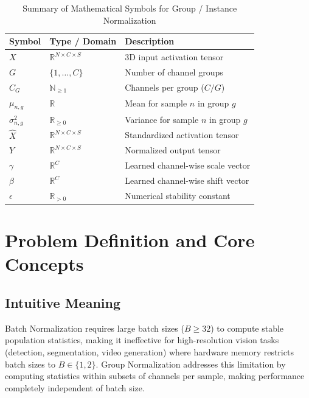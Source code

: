 \documentclass[11pt,a4paper]{article}
\theoremstyle{definition}
\begin{document}
\begin{table}[h]
\centering
\caption{Summary of Mathematical Symbols for Group / Instance Normalization}
\begin{tabular}{lll}
\toprule
\textbf{Symbol} & \textbf{Type / Domain} & \textbf{Description} \\
\midrule
$X$ & $\mathbb{R}^{N \times C \times S}$ & 3D input activation tensor \\
$G$ & $\{1, \dots, C\}$ & Number of channel groups \\
$C_G$ & $\mathbb{N}_{\ge 1}$ & Channels per group ($C / G$) \\
$\mu_{n, g}$ & $\mathbb{R}$ & Mean for sample $n$ in group $g$ \\
$\sigma_{n, g}^2$ & $\mathbb{R}_{\ge 0}$ & Variance for sample $n$ in group $g$ \\
$\hat{X}$ & $\mathbb{R}^{N \times C \times S}$ & Standardized activation tensor \\
$Y$ & $\mathbb{R}^{N \times C \times S}$ & Normalized output tensor \\
$\gamma$ & $\mathbb{R}^C$ & Learned channel-wise scale vector \\
$\beta$ & $\mathbb{R}^C$ & Learned channel-wise shift vector \\
$\epsilon$ & $\mathbb{R}_{> 0}$ & Numerical stability constant \\
\bottomrule
\end{tabular}
\end{table}

\section{Problem Definition and Core Concepts}

\subsection{Intuitive Meaning}
Batch Normalization requires large batch sizes ($B \ge 32$) to compute stable population statistics, making it ineffective for high-resolution vision tasks (detection, segmentation, video generation) where hardware memory restricts batch sizes to $B \in \{1, 2\}$. Group Normalization addresses this limitation by computing statistics within subsets of channels per sample, making performance completely independent of batch size.
\end{document}
